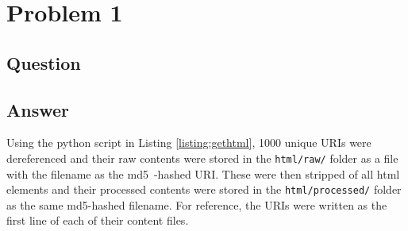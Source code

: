 \section{Problem 1}

\subsection{Question}
\vspace*{10pt}


\subsection{Answer}
\vspace{2mm}
Using the python script in Listing \ref{listing:gethtml}, 1000 unique URIs were dereferenced and
their raw contents were stored in the {\tt html/raw/} folder as a file with the filename as the
md5~\cite{md5}-hashed URI. These were then stripped of all html elements and their processed contents were 
stored in the {\tt html/processed/} folder as the same md5-hashed filename. For reference, the URIs were written as the first line of each of their content files.\cite{requests}\cite{futures}\cite{beautifulsoup}
\vspace{5mm}

\vspace*{5pt}
